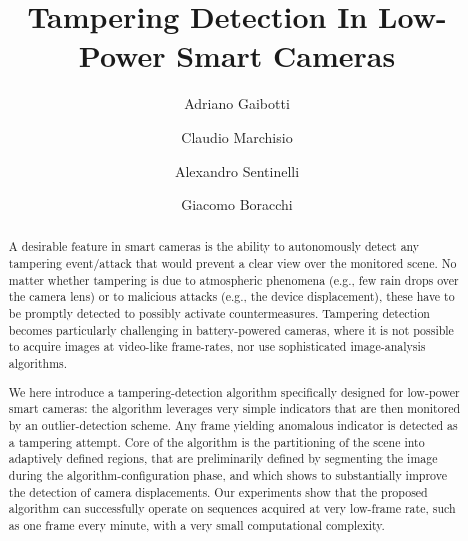 \documentclass{llncs}
\begin{document}
\title{Tampering Detection In Low-Power Smart Cameras}

\author{Adriano Gaibotti \and Claudio Marchisio \and Alexandro Sentinelli \and Giacomo Boracchi}

\maketitle

\begin{abstract}
A desirable feature in smart cameras is the ability to autonomously detect any tampering event/attack that would prevent a clear view over the monitored scene. No matter whether tampering is due to atmospheric phenomena (e.g., few rain drops over the camera lens) or to malicious attacks (e.g., the device displacement), these have to be promptly detected to possibly activate countermeasures. Tampering detection becomes particularly challenging in battery-powered cameras, where it is not possible to acquire images at video-like frame-rates, nor use sophisticated image-analysis algorithms. 

We here introduce a tampering-detection algorithm specifically designed for low-power smart cameras: the algorithm leverages very simple indicators that are then monitored by an outlier-detection scheme. Any frame yielding anomalous indicator is detected as a tampering attempt. Core of the algorithm is the partitioning of the scene into adaptively defined regions, that are preliminarily defined by segmenting the image during the algorithm-configuration phase, and which shows to substantially improve the detection of camera displacements. Our experiments show that the proposed algorithm can successfully operate on sequences acquired at very low-frame rate, such as one frame every minute, with a very small computational complexity. %
\end{abstract}
\end{document}
